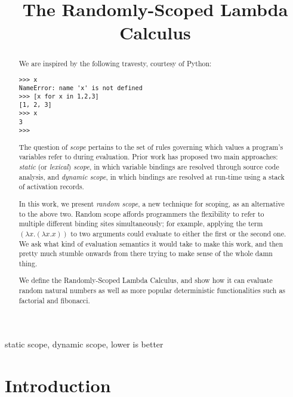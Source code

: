 \documentclass{sigplanconf}
\begin{document}
\copyrightdata{[to be supplied]} 


\title{
  The Randomly-Scoped Lambda Calculus
}



\maketitle

\begin{abstract}

We are inspired by the following travesty, courtesy of Python:
\begin{verbatim}
>>> x
NameError: name 'x' is not defined
>>> [x for x in 1,2,3]
[1, 2, 3]
>>> x
3
>>>
\end{verbatim}

The question of {\em scope} pertains to the set of rules governing which values a program's variables refer to during evaluation.
Prior work has proposed two main approaches: {\em static} (or {\em lexical}) {\em scope}, in which variable bindings are resolved through source code analysis, and {\em dynamic scope}, in which bindings are resolved at run-time using a stack of activation records.

In this work, we present {\em random scope}, a new technique for scoping, as an alternative to the above two.
Random scope affords programmers the flexibility to refer to multiple different binding sites simultaneously; for example, applying the term $(\lambda x. (\lambda x. x))$ to two arguments could evaluate to either the first or the second one.
We ask what kind of evaluation semantics it would take to make this work, and then pretty much stumble onwards from there trying to make sense of the whole damn thing.

We define the Randomly-Scoped Lambda Calculus, and show how it can evaluate random natural numbers as well as more popular deterministic functionalities such as factorial and fibonacci.

\end{abstract}


\keywords
static scope, dynamic scope, lower is better

\section{Introduction}



\end{document}
